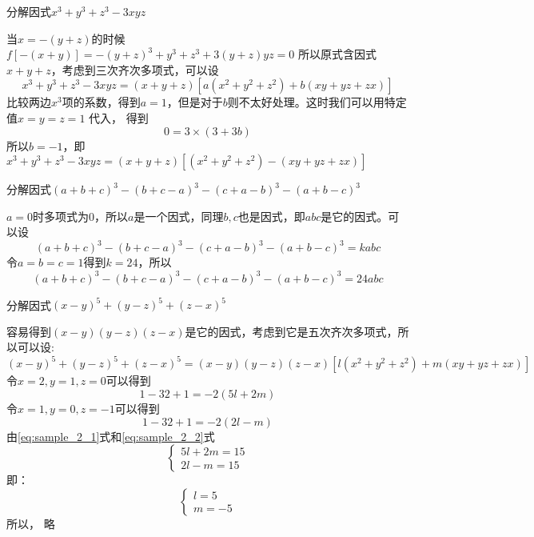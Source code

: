 \documentclass[windows,csize4,answers]{BHCexam}
\begin{document}
\begin{groups}
\begin{questions}[]
        \question[5] 分解因式$x^3+y^3+z^3-3xyz$
        \begin{solution}{0.5cm}
            \methodonly 当$x=-(y+z)$的时候$f[-(x+y)]=-(y+z)^3+y^3+z^3+3(y+z)yz=0$
            所以原式含因式$x+y+z$，考虑到三次齐次多项式，可以设
            \[
                x^3+y^3+z^3-3xyz=(x+y+z)[a(x^2+y^2+z^2)+b(xy+yz+zx)]
            \]
            比较两边$x^3$项的系数，得到$a=1$，但是对于$b$则不太好处理。这时我们可以用特定值$x=y=z=1$ 代入，
            得到
            \[
                0=3\times (3+3b)
            \]
            所以$b=-1$，即$x^3+y^3+z^3-3xyz=(x+y+z)[(x^2+y^2+z^2)-(xy+yz+zx)]$

        \end{solution}
        \vspace{3.5cm}

        \question[5] 分解因式$(a+b+c)^3-(b+c-a)^3-(c+a-b)^3-(a+b-c)^3$
        \begin{solution}{0.5cm}
            \methodonly $a=0$时多项式为$0$，所以$a$是一个因式，同理$b,c$也是因式，即$abc$是它的因式。可以设
            \[
                (a+b+c)^3-(b+c-a)^3-(c+a-b)^3-(a+b-c)^3=kabc
            \]
            令$a=b=c=1$得到$k=24$，所以
            \[
                (a+b+c)^3-(b+c-a)^3-(c+a-b)^3-(a+b-c)^3=24abc
            \]
        \end{solution}
        \vspace{3.5cm}

        \question[5] 分解因式$(x-y)^5+(y-z)^5+(z-x)^5$
        \begin{solution}{0.5cm}
            \methodonly 容易得到$(x-y)(y-z)(z-x)$是它的因式，考虑到它是五次齐次多项式，所以可以设:
            \[
                (x-y)^5+(y-z)^5+(z-x)^5=(x-y)(y-z)(z-x)[l(x^2+y^2+z^2)+m(xy+yz+zx)]
            \]
            令$x=2,y=1,z=0$可以得到
            \begin{equation}
                \label{eq:sample_2_1}
                1-32+1=-2(5l+2m)
            \end{equation}
            令$x=1,y=0,z=-1$可以得到
            \begin{equation}
                \label{eq:sample_2_2}
                1-32+1=-2(2l-m)
            \end{equation}
            由\ref{eq:sample_2_1}式和\ref{eq:sample_2_2}式
            \begin{equation}
                \begin{cases}
                    5l+2m=15 \\
                    2l-m=15
                \end{cases}
            \end{equation}
            即：
            \begin{equation}
                \begin{cases}
                    l=5 \\
                    m=-5
                \end{cases}
            \end{equation}
            所以， 略 
        \end{solution}
        \vspace{3.5cm}


\end{questions}
\end{groups}
\end{document}
